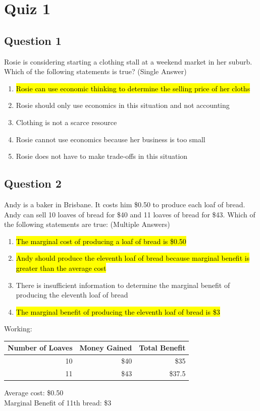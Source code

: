\section{Quiz 1}

\subsection{Question 1}
Rosie is considering starting a clothing stall at a weekend market in her suburb. Which of the following statements is true? (Single Answer)
\begin{enumerate}
	\item \hl{Rosie can use economic thinking to determine the selling price of her cloths}
	\item Rosie should only use economics in this situation and not accounting
	\item Clothing is not a scarce resource
	\item Rosie cannot use economics because her business is too small
	\item Rosie does not have to make trade-offs in this situation
\end{enumerate}

\subsection{Question 2}
Andy is a baker in Brisbane. It costs him \$0.50 to produce each loaf of bread. Andy can sell 10 loaves of bread for \$40 and 11 loaves of bread for \$43. Which of the following statements are true: (Multiple Answers)
\begin{enumerate}
	\item \hl{The marginal cost of producing a loaf of bread is \$0.50}
	\item \hl{Andy should produce the eleventh loaf of bread because marginal benefit is greater than the average cost}
	\item There is insufficient information to determine the marginal benefit of producing the eleventh loaf of bread
	\item \hl{The marginal benefit of producing the eleventh loaf of bread is \$3}
\end{enumerate}\vspace{1em}
Working:
\begin{table}[H]
	\centering
	\begin{tabular}{r|rr}
		Number of Loaves & Money Gained & Total Benefit\\\hline
		10 & \$40 & \$35\\
		11 & \$43 & \$37.5\\
	\end{tabular}
\end{table}
\noindent Average cost: \$0.50\\
Marginal Benefit of 11th bread: \$3

